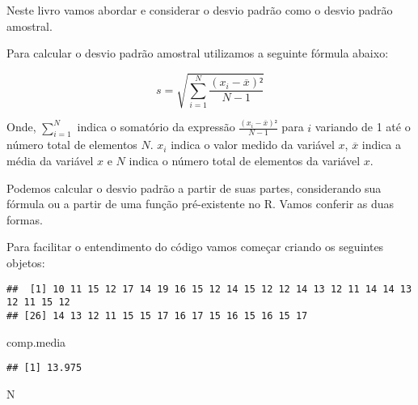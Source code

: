 \documentclass[titlepage, oneside, openany, a4paper]{book}
\newenvironment{Shaded}{\begin{snugshade}}{\end{snugshade}}
\newcommand{\KeywordTok}[1]{\textcolor[rgb]{0.13,0.29,0.53}{\textbf{#1}}}
\newcommand{\NormalTok}[1]{#1}
\newcommand{\OperatorTok}[1]{\textcolor[rgb]{0.81,0.36,0.00}{\textbf{#1}}}
\newcommand{\StringTok}[1]{\textcolor[rgb]{0.31,0.60,0.02}{#1}}
\begin{document}
Neste livro vamos abordar e considerar o desvio padrão como o desvio padrão amostral.

Para calcular o desvio padrão amostral utilizamos a seguinte fórmula abaixo:

\[s = \sqrt{\sum^{N}_{i = 1}\frac{(x_{i}-\overline{x})²}{N-1}}\]

Onde, \(\sum^{N}_{i=1}\) indica o somatório da expressão \(\frac{(x_{i}-\overline{x})²}{N-1}\) para \(i\) variando de 1 até o número total de elementos \(N\). \(x_{i}\) indica o valor medido da variável \(x\), \(\overline{x}\) indica a média da variável \(x\) e \(N\) indica o número total de elementos da variável \(x\).

Podemos calcular o desvio padrão a partir de suas partes, considerando sua fórmula ou a partir de uma função pré-existente no R. Vamos conferir as duas formas.

Para facilitar o entendimento do código vamos começar criando os seguintes objetos:

\begin{Shaded}
\end{Shaded}

\begin{verbatim}
##  [1] 10 11 15 12 17 14 19 16 15 12 14 15 12 12 14 13 12 11 14 14 13 12 11 15 12
## [26] 14 13 12 11 15 15 17 16 17 15 16 15 16 15 17
\end{verbatim}

\begin{Shaded}
\begin{Highlighting}[]
\NormalTok{comp.media}
\end{Highlighting}
\end{Shaded}

\begin{verbatim}
## [1] 13.975
\end{verbatim}

\begin{Shaded}
\begin{Highlighting}[]
\NormalTok{N}
\end{Highlighting}
\end{Shaded}
\end{document}
